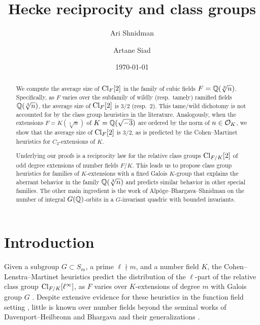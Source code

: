 \documentclass[11pt,a4paper]{amsart}
\def\Q{{\rm \mathbb{Q}}}
\def\O{{\rm \mathcal{O}}}
\def\Cl{{\rm Cl}}
\numberwithin{equation}{section}
\begin{document}
\title{Hecke reciprocity and class groups}

\author{Ari Shnidman}
\address{Institute for Advanced Study, 1 Einstein Drive, Princeton NJ 08540}
\author{Artane Siad}
\address{Institute for Advanced Study, 1 Einstein Drive, Princeton NJ 08540}
\date{\today}
\makeatletter
\DeclareRobustCommand{\pmods}[1]{\mkern4mu({\operator@font mod}\mkern6mu#1)}
\makeatother

\begin{abstract}
We compute the average size of $\Cl_F[2]$ in the family of cubic fields $F = \Q(\sqrt[3]{n})$. Specifically, as $F$ varies over the subfamily of wildly (resp.\ tamely) ramified fields $\Q(\sqrt[3]{n})$, the average size of $\Cl_F[2]$ is $3/2$ (resp.\ $2$). This tame/wild dichotomy is not accounted for by the class group heuristics in the literature.  Analogously, when the extensions $F = K(\sqrt[3]{n})$ of $K = \Q(\sqrt{-3})$ are ordered by the norm of $n \in \O_K$, we show that the average size of $\Cl_F[2]$ is $3/2$, as is predicted by the Cohen--Martinet heuristics for $C_3$-extensions of $K$.   

Underlying our proofs is a reciprocity law for the relative class groups $\Cl_{F/K}[2]$ of odd degree extensions of number fields $F/K$. 
This leads us to propose class group heuristics for families of $K$-extensions with a fixed Galois $K$-group that explains the aberrant  behavior in the family $\Q(\sqrt[3]{n})$ and predicts similar behavior in other special families. The other main ingredient is the work of Alp\"oge--Bhargava--Shnidman on the number of integral $G(\Q)$-orbits in a $G$-invariant quadric with bounded invariants.  
\end{abstract}
\maketitle

\tableofcontents

\makeatletter
\makeatother

\section{Introduction}
    Given a subgroup $G \subset S_m$, a prime $\ell \nmid m$, and a number field $K$, the Cohen--Lenstra--Martinet heuristics predict the distribution of the $\ell$-part of the relative class group $\Cl_{F/K}[\ell^\infty]$, as $F$ varies over $K$-extensions of degree $m$ with Galois group $G$ \cite{CohenLenstra1983,CohenMartinet90}. Despite extensive evidence for these heuristics in the function field setting \cite{EllenbergVenkateshWesterland,LiuWoodZureickBrown,LandesmanLevy}, little is known over number fields beyond the seminal works of Davenport--Heilbronn \cite{DavenportHeilbronn} and Bhargava \cite{BhargavaQuartics} and their generalizations \cite{DatskovskyWright,BhargavaShankarWangGlobalFields,LemkeOliverWangWood}.
\end{document}
